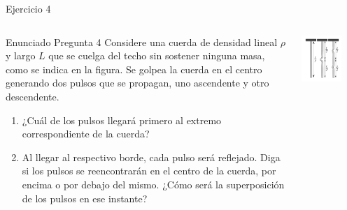 \documentclass[
    10pt,
    aspectratio=169,
    xcolor={dvipsnames},
    spanish,
    ]{beamer}
\begin{document}
\begin{frame}{Ejercicio 4}
  \begin{columns}[T,totalwidth=\textwidth]
    \begin{column}{0.58\textwidth}
      \begin{block}{Enunciado Pregunta 4}
     Considere una cuerda de densidad lineal $\rho$ y largo $L$ que se cuelga del techo
sin sostener ninguna masa, como se indica en la figura. Se golpea la cuerda en el
centro generando dos pulsos que se propagan, uno ascendente y otro descendente.

\begin{enumerate}
  \item ¿Cuál de los pulsos llegará primero al extremo correspondiente de la cuerda?
  \item Al llegar al respectivo borde, cada pulso será reflejado. Diga si los pulsos se reencontrarán en el centro de la cuerda, por encima o por debajo del mismo. ¿Cómo será la superposición de los pulsos en ese instante?
\end{enumerate}
      \end{block}
    \end{column}
    \begin{column}{0.50\textwidth}
      \centering
  \vspace*{1cm}
      \includegraphics[width=0.7\textwidth]{Auxiliar_2_3.png}
    \end{column}
  \end{columns}
\end{frame}
\end{document}
